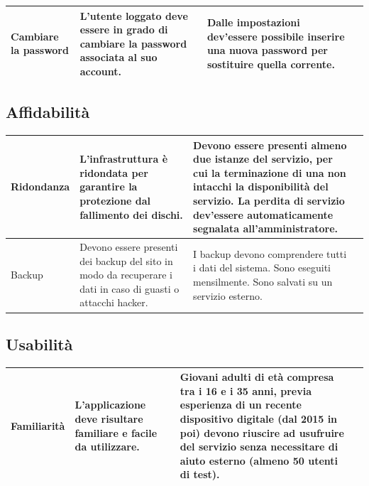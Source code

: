 \documentclass[a4paper,12pt]{article}
\begin{document}
{
    \centering
    \begin{tabularx}{\textwidth}{|l|>{\raggedright\arraybackslash}X|>{\raggedright\arraybackslash}X|>{\raggedright\arraybackslash}X|}
    \hline
    Cambiare la password & L’utente loggato deve essere in grado di cambiare la password associata al suo account. & Dalle impostazioni dev’essere possibile inserire una nuova password per sostituire quella corrente. \\
    \hline
    \end{tabularx} \par
}
\subsection*{Affidabilità}

{
    \centering
    \begin{tabularx}{\textwidth}{|l|>{\raggedright\arraybackslash}X|>{\raggedright\arraybackslash}X|>{\raggedright\arraybackslash}X|}
    \hline
    Ridondanza & L’infrastruttura è ridondata per garantire la protezione dal fallimento dei dischi. & Devono essere presenti almeno due istanze del servizio, per cui la terminazione di una non intacchi la disponibilità del servizio. La perdita di servizio dev’essere automaticamente segnalata all’amministratore. \\ \hline
    Backup & Devono essere presenti dei backup del sito in modo da recuperare i dati in caso di guasti o attacchi hacker. & I backup devono comprendere tutti i dati del sistema. Sono eseguiti mensilmente. Sono salvati su un servizio esterno. \\
    \hline
    \end{tabularx} \par
}
\subsection*{Usabilità}

{
    \centering
    \begin{tabularx}{\textwidth}{|l|>{\raggedright\arraybackslash}X|>{\raggedright\arraybackslash}X|>{\raggedright\arraybackslash}X|}
    \hline
    Familiarità & L’applicazione deve risultare familiare e facile da utilizzare. & Giovani adulti di età compresa tra i 16 e i 35 anni, previa esperienza di un recente dispositivo digitale (dal 2015 in poi) devono riuscire ad usufruire del servizio senza necessitare di aiuto esterno (almeno 50 utenti di test). \\
    \hline
    \end{tabularx} \par
}
\end{document}
